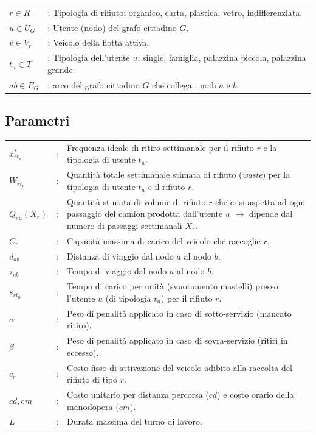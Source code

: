\begin{tabular}{ll}
$r \in R$   & : Tipologia di rifiuto: organico, carta, plastica, vetro, indifferenziata. \\
$u \in U_G$   & : Utente (nodo) del grafo cittadino $G$. \\
$v \in V_r$ & : Veicolo della flotta attiva. \\
$t_u \in T$ & : Tipologia dell'utente $u$: single, famiglia, palazzina piccola, palazzina grande. \\
$ab \in E_G$ & : arco del grafo cittadino $G$ che collega i nodi $a$ e $b$.
\end{tabular}

\subsection{Parametri}

\begin{longtable}[l]{@{}ll>{\raggedright\arraybackslash}p{11cm}}
$x^*_{r t_u}$ & : & Frequenza ideale di ritiro settimanale per il rifiuto $r$ e la tipologia di utente $t_u$. \\
$W_{r t_u}$ & : & Quantità totale settimanale stimata di rifiuto (\textit{waste}) per la tipologia di utente $t_u$ e il rifiuto $r$. \\
$Q_{ru}(X_r)$ & : & Quantità stimata di volume di rifiuto $r$ che ci si aspetta ad ogni passaggio del camion prodotta dall'utente $u$ $\rightarrow$ dipende dal numero di passaggi settimanali $X_r$. \\
$C_r$ & : & Capacità massima di carico del veicolo che raccoglie $r$. \\
$d_{ab}$ & : & Distanza di viaggio dal nodo $a$ al nodo $b$. \\
$\tau_{ab}$ & : & Tempo di viaggio dal nodo $a$ al nodo $b$. \\
$s_{r t_u}$ & : & Tempo di carico per unità (svuotamento mastelli) presso l'utente $u$ (di tipologia $t_u$) per il rifiuto $r$. \\
$\alpha$ & : & Peso di penalità applicato in caso di sotto-servizio (mancato ritiro). \\
$\beta$ & : & Peso di penalità applicato in caso di sovra-servizio (ritiri in eccesso). \\
$c_r$ & : & Costo fisso di attivazione del veicolo adibito alla raccolta del rifiuto di tipo $r$. \\
$cd, cm$ & : & Costo unitario per distanza percorsa ($cd$) e costo orario della manodopera ($cm$). \\
$L$ & : & Durata massima del turno di lavoro. \\
\end{longtable}

